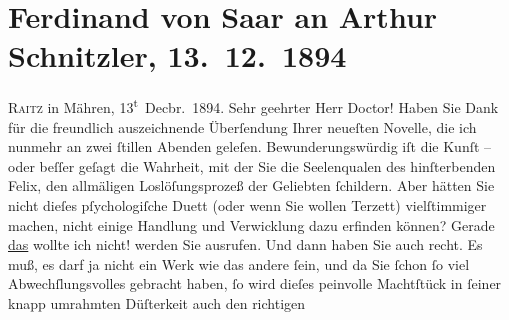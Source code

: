 

               \section[Ferdinand von Saar an Arthur Schnitzler, 13. 12. 1894]{ Ferdinand von Saar an Arthur Schnitzler,
                    13. 12. 1894}\nopagebreak{}\rehead{ }\begin{ledgroupsized}[t]{13cm}\normalsize\beginnumbering{} \toendnotes[C]{\smallbreak\pagebreak[2]} 
\toendnotes[C]{\smallbreak}\pstart
           \raggedleft{}{\pb}\textsc{Raitz} in Mähren, 13\textsuperscript{t} Decbr. 1894.\pend
           \pstart{}Sehr geehrter Herr Doctor!\pend\pstart
           Haben Sie Dank für die freundlich auszeichnende Überſendung Ihrer neueſten Novelle, die ich nunmehr an zwei ſtillen Abenden
                    geleſen. Bewunderungswürdig iſt die Kunſt – oder beſſer geſagt die Wahrheit, mit
                    der Sie die Seelenqualen des hinſterbenden Felix, den allmäligen Loslöſungsprozeß der Geliebten ſchildern.
                    Aber hätten Sie nicht dieſes pſychologiſche Duett (oder wenn Sie wollen Terzett)
                    vielſtimmiger machen, nicht einige Handlung und Verwicklung dazu erfinden
                    können? Gerade \uline{das} wollte ich nicht! werden Sie
                    ausrufen. Und dann haben Sie auch recht. Es muß, es darf ja nicht ein Werk wie
                    das {\pb}andere ſein, und da Sie ſchon ſo
                    viel Abwechſlungsvolles gebracht haben, ſo wird dieſes peinvolle Machtſtück in
                    ſeiner knapp umrahmten Düſterkeit \introOben{}auch\introOben{} den richtigen

\end{ledgroupsized}
